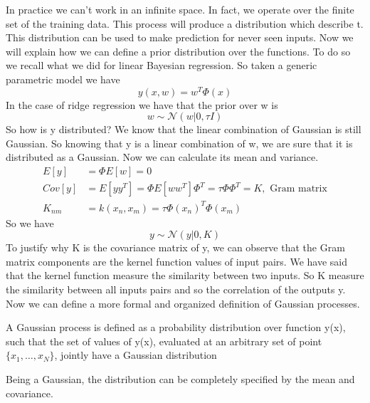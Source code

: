 \documentclass[../main.tex]{subfiles}
\begin{document}
In practice we can't work in an infinite space. In fact, we operate over the finite set of the training data. This process will produce a distribution which describe t. This distribution can be used to make prediction for never seen inputs.
Now we will explain how we can define a prior distribution over the functions. To do so we recall what we did for linear Bayesian regression. So taken a generic parametric model we have
\begin{equation*}
    y(x,w)=w^T \Phi(x)
\end{equation*}
In the case of ridge regression we have that the prior over w is
\begin{equation*}
    w \sim \mathcal{N}(w|0, \tau I)
\end{equation*}
So how is y distributed?\footnotemark {} We know that the linear combination of Gaussian is still Gaussian. So knowing that y is a linear combination of w, we are sure that it is distributed as a Gaussian. Now we can calculate its mean and variance.
\begin{align*}
    E[y]   & = \Phi E[w] = 0                                                             \\
    Cov[y] & = E[yy^T] = \Phi E[ww^T] \Phi^T = \tau \Phi \Phi^T = K, \text{ Gram matrix} \\
    K_{nm} & = k(x_n, x_m) = \tau\Phi(x_n)^T\Phi(x_m)
\end{align*}
So we have
\begin{equation}
    y \sim \mathcal{N}(y|0, K)
\end{equation}
To justify why K is the covariance matrix of y, we can observe that the Gram matrix components are the kernel function values of input pairs. We have said that the kernel function measure the similarity between two inputs. So K measure the similarity between all inputs pairs and so the correlation of the outputs y.
Now we can define a more formal and organized definition of Gaussian processes.
\begin{definition}
    A Gaussian process is defined as a probability distribution over function y(x), such that the set of values of y(x), evaluated at an arbitrary set of point $\{x_1, \dots, x_N\}$, jointly have a Gaussian distribution
\end{definition}
Being a Gaussian, the distribution can be completely specified by the mean and covariance.
\end{document}
